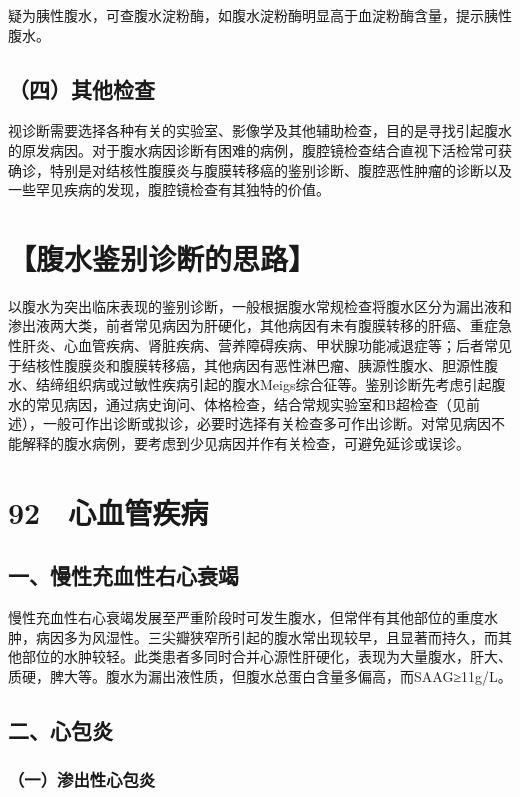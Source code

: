 疑为胰性腹水，可查腹水淀粉酶，如腹水淀粉酶明显高于血淀粉酶含量，提示胰性腹水。

\subsection{（四）其他检查}

视诊断需要选择各种有关的实验室、影像学及其他辅助检查，目的是寻找引起腹水的原发病因。对于腹水病因诊断有困难的病例，腹腔镜检查结合直视下活检常可获确诊，特别是对结核性腹膜炎与腹膜转移癌的鉴别诊断、腹腔恶性肿瘤的诊断以及一些罕见疾病的发现，腹腔镜检查有其独特的价值。

\section{【腹水鉴别诊断的思路】}

以腹水为突出临床表现的鉴别诊断，一般根据腹水常规检查将腹水区分为漏出液和渗出液两大类，前者常见病因为肝硬化，其他病因有未有腹膜转移的肝癌、重症急性肝炎、心血管疾病、肾脏疾病、营养障碍疾病、甲状腺功能减退症等；后者常见于结核性腹膜炎和腹膜转移癌，其他病因有恶性淋巴瘤、胰源性腹水、胆源性腹水、结缔组织病或过敏性疾病引起的腹水Meigs综合征等。鉴别诊断先考虑引起腹水的常见病因，通过病史询问、体格检查，结合常规实验室和B超检查（见前述），一般可作出诊断或拟诊，必要时选择有关检查多可作出诊断。对常见病因不能解释的腹水病例，要考虑到少见病因并作有关检查，可避免延诊或误诊。

\protect\hypertarget{text00220.html}{}{}

\section{92　心血管疾病}

\subsection{一、慢性充血性右心衰竭}

慢性充血性右心衰竭发展至严重阶段时可发生腹水，但常伴有其他部位的重度水肿，病因多为风湿性。三尖瓣狭窄所引起的腹水常出现较早，且显著而持久，而其他部位的水肿较轻。此类患者多同时合并心源性肝硬化，表现为大量腹水，肝大、质硬，脾大等。腹水为漏出液性质，但腹水总蛋白含量多偏高，而SAAG≥11g/L。

\subsection{二、心包炎}

\subsubsection{（一）渗出性心包炎}

